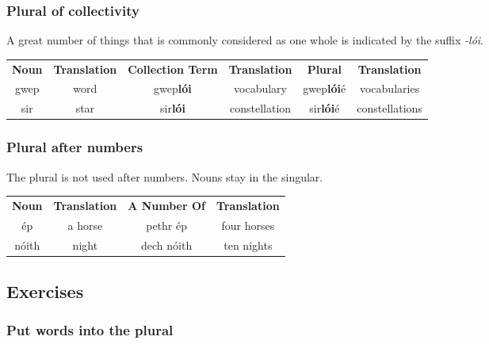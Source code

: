 \subsubsection{Plural of collectivity}

A great number of things that is commonly considered as one whole is indicated by the suffix \textit{-l\'{o}i}.
\begin{table}[H]
\centering
\begin{tabular}{cccccc}
  \toprule
  \textbf{Noun} & \textbf{Translation} & \textbf{Collection Term} & \textbf{Translation} & \textbf{Plural} & \textbf{Translation}\\
  \cmidrule(lr){1-1}\cmidrule(lr){2-2}\cmidrule(lr){3-3}\cmidrule(lr){4-4}\cmidrule(lr){5-5}\cmidrule(lr){6-6}
  gwep & word & gwep\textbf{l\'{o}i} & vocabulary & gwep\textbf{l\'{o}i}\'{e} & vocabularies\\
  sir & star & sir\textbf{l\'{o}i} & constellation & sir\textbf{l\'{o}i}\'{e} & constellations\\
  \bottomrule
\end{tabular}
\label{example_plural_one_whole}
\end{table}

\subsubsection{Plural after numbers}

The plural is not used after numbers. Nouns stay in the singular.
\begin{table}[H]
\centering
\begin{tabular}{cccc}
  \toprule
  \textbf{Noun} & \textbf{Translation} & \textbf{A Number Of} & \textbf{Translation}\\
  \cmidrule(lr){1-1}\cmidrule(lr){2-2}\cmidrule(lr){3-3}\cmidrule(lr){4-4}
  \'{e}p & a horse & pethr \'{e}p & four horses\\
  n\'{o}ith & night & dech n\'{o}ith & ten nights\\
  \bottomrule
\end{tabular}
\label{example_plural_one_whole}
\end{table}

\newpage
\subsection{Exercises}

\subsubsection{Put words into the plural}


